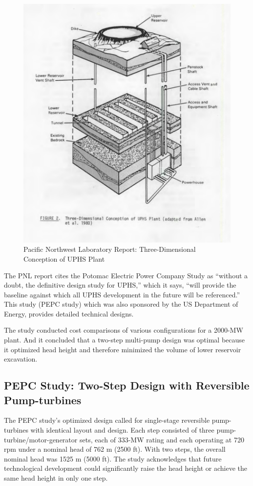 \documentclass[hidelinks,12pt,a4paper]{article}
\begin{document}
\begin{figure}[ht!]
    \centering
    \includegraphics[width=1\textwidth]{pnl-report-diagram-2.png}
    \caption{Pacific Northwest Laboratory Report: Three-Dimensional Conception of UPHS Plant \cite{UndergroundPumpedHydroelectricStorage}}
\end{figure}
\FloatBarrier

The PNL report cites the Potomac Electric Power Company Study as
“without a doubt, the definitive design study for UPHS,” which it says, “will provide the baseline against which all UPHS development in the future will be referenced.” This study (PEPC study) which was also sponsored by the US Department of Energy, provides detailed technical designs.

The study conducted cost comparisons of various configurations for a 2000-MW plant. And it concluded that a two-step multi-pump design was optimal because it optimized head height and therefore minimized the volume of lower reservoir excavation.

\subsection{PEPC Study: Two-Step Design with Reversible Pump-turbines}
The PEPC study's optimized design called for single-stage reversible pump-turbines with identical layout and design. Each step consisted of three pump-turbine/motor-generator sets, each of 333-MW rating and each operating at 720 rpm under a nominal head of 762 m (2500 ft). With two steps, the overall nominal head was 1525 m (5000 ft). The study acknowledges that future technological development could significantly raise the head height or achieve the same head height in only one step.
\end{document}
